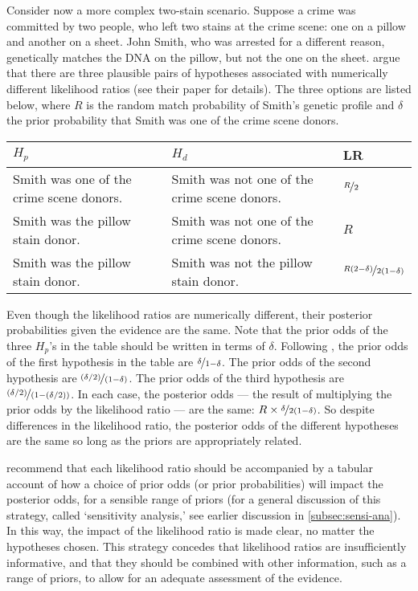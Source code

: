 \documentclass{article}
\begin{document}
Consider now a more complex two-stain scenario. Suppose a crime was committed by two people, who left two stains at the crime scene: one on a pillow and another on a sheet. John Smith, who was arrested for a different reason, genetically matches the DNA on the pillow, but not the one on the sheet. %
\cite{meester2004WhyEffectPriora} argue that there are  three plausible pairs of hypotheses associated with numerically different likelihood ratios (see their paper for details). The three options are listed below, where $R$ is the random match probability of Smith's genetic profile and $\delta$ the prior probability that Smith was one of the crime scene donors.
\begin{center}
	\footnotesize
	\begin{tabular}{@{}p{5cm}p{5cm}l@{}}
		\toprule
		$H_p$ & $H_d$  & LR \\ \midrule
		Smith was one of the crime scene donors.   &  Smith was not one of the crime scene donors. & $\nicefrac{R}{2}$   \\
		Smith was the pillow stain donor.     & Smith was not one of the crime scene donors.& $R$\\
		Smith was the pillow stain donor. & Smith was not the pillow stain donor. &  $\nicefrac{R(2-\delta)}{2(1-\delta)}$
		\\ \bottomrule
	\end{tabular}
\end{center}
\normalsize

\noindent

Even though the likelihood ratios are numerically different, their posterior probabilities given the evidence are the same. Note that the prior odds of the three $H_p$'s in the table should be written in terms of $\delta$. Following  \cite{meester2004WhyEffectPriora},
 the prior odds of the first hypothesis in the table are  $\nicefrac{\delta}{1-\delta}$. The prior odds of the second hypothesis are  $\nicefrac{(\delta/2)}{(1-\delta)}$. The prior odds of the third  hypothesis are $\nicefrac{(\delta/2)}{(1-(\delta/2))}$. In each case, the posterior odds --- the result of multiplying the prior odds by the likelihood ratio --- are the same: $R\times \nicefrac{\delta}{2(1-\delta)}$. So despite differences in the likelihood ratio, the posterior odds of the different hypotheses are the same so long as the priors are appropriately related.
 

\cite{meester2004WhyEffectPriora} recommend that each likelihood ratio should be accompanied by a tabular account of how a choice of prior odds (or prior probabilities) will impact the posterior odds, for a sensible range of priors (for a general discussion of this strategy, called `sensitivity analysis,' see earlier discussion in \ref{subsec:sensi-ana}). In this way, the impact of the likelihood ratio is made clear, no matter the hypotheses chosen. This strategy concedes that likelihood ratios are insufficiently informative, and that they should be combined with other information, such as a range of priors, to allow for an adequate assessment of the evidence.
\end{document}
